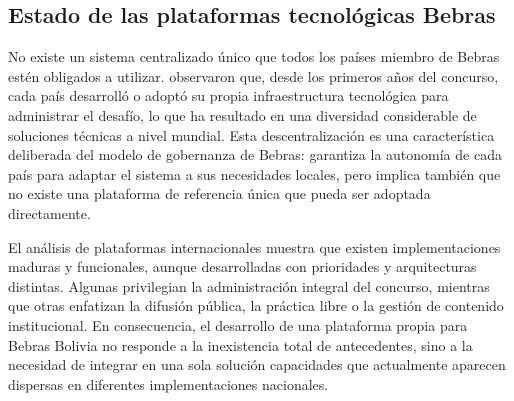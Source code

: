 \subsection{Estado de las plataformas tecnológicas Bebras}

No existe un sistema centralizado único que todos los países miembro de Bebras estén obligados a utilizar. \textcite{dagienefutschek2008} observaron que, desde los primeros años del concurso, cada país desarrolló o adoptó su propia infraestructura tecnológica para administrar el desafío, lo que ha resultado en una diversidad considerable de soluciones técnicas a nivel mundial. Esta descentralización es una característica deliberada del modelo de gobernanza de Bebras: garantiza la autonomía de cada país para adaptar el sistema a sus necesidades locales, pero implica también que no existe una plataforma de referencia única que pueda ser adoptada directamente.

El análisis de plataformas internacionales muestra que existen implementaciones maduras y funcionales, aunque desarrolladas con prioridades y arquitecturas distintas. Algunas privilegian la administración integral del concurso, mientras que otras enfatizan la difusión pública, la práctica libre o la gestión de contenido institucional. En consecuencia, el desarrollo de una plataforma propia para Bebras Bolivia no responde a la inexistencia total de antecedentes, sino a la necesidad de integrar en una sola solución capacidades que actualmente aparecen dispersas en diferentes implementaciones nacionales.